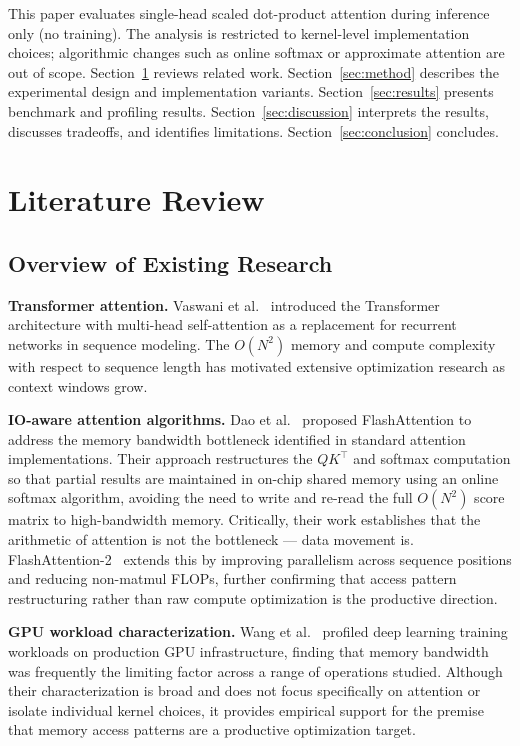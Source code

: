 \documentclass{article}
\begin{document}
This paper evaluates single-head scaled dot-product attention during inference
only (no training). The analysis is restricted to kernel-level implementation
choices; algorithmic changes such as online softmax or approximate attention
are out of scope. Section~\ref{sec:litreview} reviews related work.
Section~\ref{sec:method} describes the experimental design and implementation
variants. Section~\ref{sec:results} presents benchmark and profiling results.
Section~\ref{sec:discussion} interprets the results, discusses tradeoffs, and
identifies limitations. Section~\ref{sec:conclusion} concludes.

\section{Literature Review}
\label{sec:litreview}

\subsection{Overview of Existing Research}

\textbf{Transformer attention.}
Vaswani et al.~\cite{vaswani2017attention} introduced the Transformer
architecture with multi-head self-attention as a replacement for recurrent
networks in sequence modeling. The $O(N^2)$ memory and compute complexity
with respect to sequence length has motivated extensive optimization research
as context windows grow.

\textbf{IO-aware attention algorithms.}
Dao et al.~\cite{dao2022flashattention} proposed FlashAttention to address
the memory bandwidth bottleneck identified in standard attention
implementations. Their approach restructures the $QK^\top$ and softmax
computation so that partial results are maintained in on-chip shared memory
using an online softmax algorithm, avoiding the need to write and re-read
the full $O(N^2)$ score matrix to high-bandwidth memory. Critically, their
work establishes that the arithmetic of attention is not the bottleneck —
data movement is. FlashAttention-2~\cite{dao2023flashattention2} extends
this by improving parallelism across sequence positions and reducing
non-matmul FLOPs, further confirming that access pattern restructuring
rather than raw compute optimization is the productive direction.

\textbf{GPU workload characterization.}
Wang et al.~\cite{wang2019characterizing} profiled deep learning training
workloads on production GPU infrastructure, finding that memory bandwidth
was frequently the limiting factor across a range of operations studied.
Although their characterization is broad and does not focus specifically
on attention or isolate individual kernel choices, it provides empirical
support for the premise that memory access patterns are a productive
optimization target.
\end{document}
